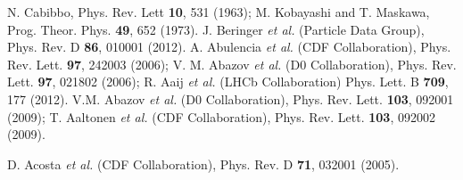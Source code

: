 \documentclass[aps,prd,twocolumn,superscriptaddress,showpacs]{revtex4}
\begin{document}
\nocite{*}
\appendix
\begin{thebibliography}{150}

 N. Cabibbo, Phys. Rev. Lett \textbf{10}, 531 (1963); M. Kobayashi and T. Maskawa, 
Prog. Theor. Phys. \textbf{49}, 652 (1973).
 J. Beringer {\it et al.} (Particle Data Group), Phys. Rev. D {\bf 86}, 010001 (2012).
 A. Abulencia  {\it et al.} (CDF Collaboration), Phys. Rev. Lett. {\bf 97}, 242003 (2006); 
V. M. Abazov  {\it et al.} (D0 Collaboration), Phys. Rev. Lett. {\bf 97}, 021802 (2006); R. Aaij {\it et al.} (LHCb Collaboration)
Phys. Lett. B {\bf 709}, 177 (2012).
 V.M. Abazov {\it et al.} (D0 Collaboration), Phys. Rev. Lett. {\bf 103}, 092001 (2009); 
T. Aaltonen {\it et al.} (CDF Collaboration), Phys. Rev. Lett. {\bf 103}, 092002 (2009).

 D. Acosta {\it et al.} (CDF Collaboration), Phys. Rev. D  \textbf{71}, 032001 (2005).


\end{thebibliography}
\end{document}
